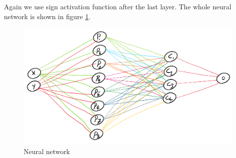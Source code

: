 \documentclass[en]{university}
\begin{document}
Again we use sign activation function after the last layer. The whole neural network is shown in figure \ref{fig:n}.

\begin{figure}[!htbp]
\centering
\includegraphics[width=1\textwidth]{assets/3n.png}
\caption{Neural network}
\label{fig:n}
\end{figure}
\end{document}
